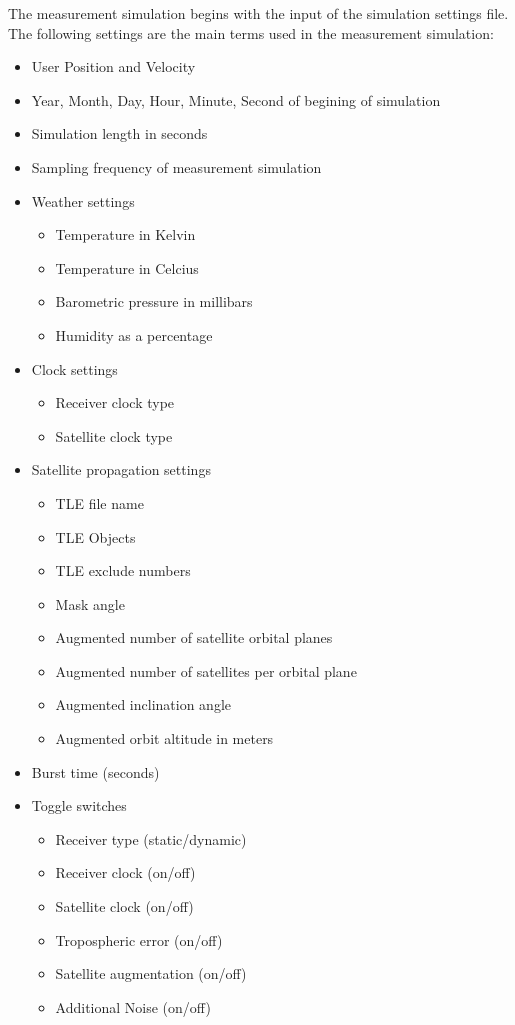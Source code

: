 \documentclass[12pt]{report}
\begin{document}
The measurement simulation begins with the input of the simulation settings file. The following settings are the main terms used in the measurement simulation:
\begin{itemize}
    \item User Position and Velocity
    \item Year, Month, Day, Hour, Minute, Second of begining of simulation
    \item Simulation length in seconds
    \item Sampling frequency of measurement simulation
    \item Weather settings
    \begin{itemize}
        \item Temperature in Kelvin
        \item Temperature in Celcius
        \item Barometric pressure in millibars
        \item Humidity as a percentage
    \end{itemize}
    \item Clock settings
     \begin{itemize}
        \item Receiver clock type
        \item Satellite clock type
     \end{itemize}
     \item Satellite propagation settings
     \begin{itemize}
        \item TLE file name
        \item TLE Objects
        \item TLE exclude numbers
        \item Mask angle
        \item Augmented number of satellite orbital planes
        \item Augmented number of satellites per orbital plane
        \item Augmented inclination angle 
        \item Augmented orbit altitude in meters 
     \end{itemize}
     \item Burst time (seconds)
     \item Toggle switches
     \begin{itemize}
        \item Receiver type (static/dynamic)
        \item Receiver clock (on/off)
        \item Satellite clock (on/off)
        \item Tropospheric error (on/off)
        \item Satellite augmentation (on/off)
        \item Additional Noise (on/off)
     \end{itemize}
\end{itemize}
\end{document}
